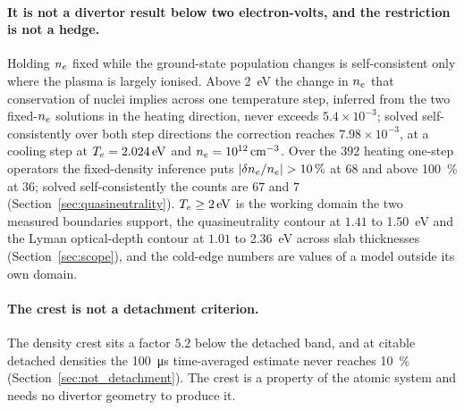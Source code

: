 \paragraph{It is not a divertor result below two electron-volts, and the
restriction is not a hedge.} Holding $n_e$ fixed while the ground-state
population changes is self-consistent only where the plasma is largely ionised.
Above \SI{2}{\electronvolt} the change in $n_e$ that conservation of nuclei
implies across one temperature step, inferred from the two fixed-$n_e$
solutions in the heating direction, never exceeds $5.4\times10^{-3}$; solved
self-consistently over both step directions the correction reaches
$7.98\times10^{-3}$, at a cooling step at $T_e = \SI{2.024}{\electronvolt}$ and
$n_e = \SI{e12}{\per\cubic\centi\metre}$. Over the $392$ heating one-step
operators the fixed-density inference puts $|\delta n_e/n_e| > \SI{10}{\percent}$
at $68$ and above \SI{100}{\percent} at $36$; solved self-consistently the
counts are $67$ and $7$ (Section~\ref{sec:quasineutrality}).
$T_e\ge\SI{2}{\electronvolt}$ is the working domain the two measured
boundaries support, the quasineutrality contour at $1.41$ to
\SI{1.50}{\electronvolt} and the Lyman optical-depth contour at $1.01$ to
\SI{2.36}{\electronvolt} across slab thicknesses (Section~\ref{sec:scope}),
and the cold-edge numbers are values of a model outside its own domain.

\paragraph{The crest is not a detachment criterion.} The density crest sits a factor $5.2$ below
the detached band, and at citable detached densities the \SI{100}{\micro\second} time-averaged estimate
never reaches \SI{10}{\percent} (Section~\ref{sec:not_detachment}). The crest is
a property of the atomic system and needs no divertor geometry to produce it.

